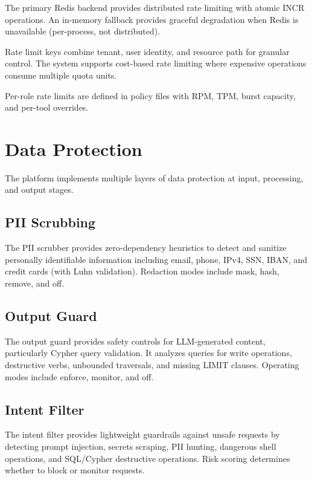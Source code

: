 \documentclass[a4paper,twoside]{sapthesis}
\begin{document}
The primary Redis backend provides distributed rate limiting with atomic INCR operations. An in-memory fallback provides graceful degradation when Redis is unavailable (per-process, not distributed).

Rate limit keys combine tenant, user identity, and resource path for granular control. The system supports cost-based rate limiting where expensive operations consume multiple quota units.

Per-role rate limits are defined in policy files with RPM, TPM, burst capacity, and per-tool overrides.

\section{Data Protection}
\label{sec:data-protection}

The platform implements multiple layers of data protection at input, processing, and output stages.

\subsection{PII Scrubbing}
\label{subsec:pii-scrubbing}

The PII scrubber provides zero-dependency heuristics to detect and sanitize personally identifiable information including email, phone, IPv4, SSN, IBAN, and credit cards (with Luhn validation). Redaction modes include mask, hash, remove, and off.

\subsection{Output Guard}
\label{subsec:output-guard}

The output guard provides safety controls for LLM-generated content, particularly Cypher query validation. It analyzes queries for write operations, destructive verbs, unbounded traversals, and missing LIMIT clauses. Operating modes include enforce, monitor, and off.

\subsection{Intent Filter}
\label{subsec:intent-filter}

The intent filter provides lightweight guardrails against unsafe requests by detecting prompt injection, secrets scraping, PII hunting, dangerous shell operations, and SQL/Cypher destructive operations. Risk scoring determines whether to block or monitor requests.
\end{document}
